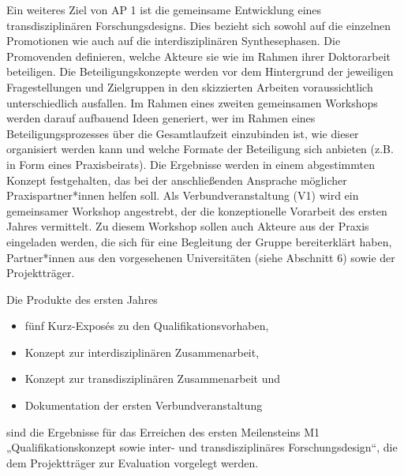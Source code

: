 \documentclass[a4paper,11pt,twoside]{scrartcl}
\begin{document}
Ein weiteres Ziel von AP 1 ist die gemeinsame Entwicklung eines transdisziplinären Forschungsdesigns. Dies bezieht sich sowohl auf die einzelnen Promotionen wie auch auf die interdisziplinären Synthesephasen. Die Promovenden definieren, welche Akteure sie wie im Rahmen ihrer Doktorarbeit beteiligen. Die Beteiligungskonzepte werden vor dem Hintergrund der jeweiligen Fragestellungen und Zielgruppen in den skizzierten Arbeiten voraussichtlich unterschiedlich ausfallen. Im Rahmen eines zweiten gemeinsamen Workshops werden darauf aufbauend Ideen generiert, wer im Rahmen eines Beteiligungsprozesses über die Gesamtlaufzeit einzubinden ist, wie dieser organisiert werden kann und welche Formate der Beteiligung sich anbieten (z.B. in Form eines Praxisbeirats). Die Ergebnisse werden in einem abgestimmten Konzept festgehalten, das bei der anschließenden Ansprache möglicher Praxispartner*innen helfen soll. 
Als Verbundveranstaltung (V1) wird ein gemeinsamer Workshop angestrebt, der die konzeptionelle Vorarbeit des ersten Jahres vermittelt. Zu diesem Workshop sollen auch Akteure aus der Praxis eingeladen werden, die sich für eine Begleitung der Gruppe bereiterklärt haben, Partner*innen aus den vorgesehenen Universitäten (siehe Abschnitt 6) sowie der Projektträger.

Die Produkte des ersten Jahres
\begin{itemize}
    \item fünf Kurz-Exposés zu den Qualifikationsvorhaben, 
    \item Konzept zur interdisziplinären Zusammenarbeit,
    \item Konzept zur transdisziplinären Zusammenarbeit und
    \item Dokumentation der ersten Verbundveranstaltung 
\end{itemize}
sind die Ergebnisse für das Erreichen des ersten Meilensteins M1 „Qualifikationskonzept sowie inter- und transdisziplinäres Forschungsdesign“, die dem Projektträger zur Evaluation vorgelegt werden.
\end{document}
